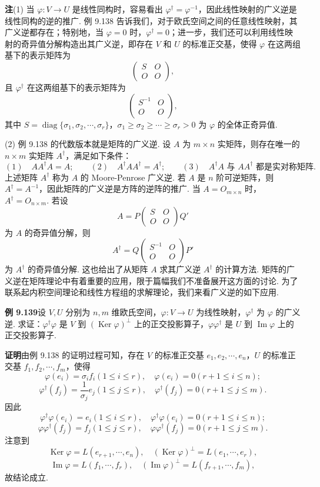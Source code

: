 \documentclass[UTF8, 12pt, fontset=fandol, oneside]{ctexart}
\begin{document}
\noindent\textbf{注}\quad (1) 当 $\varphi:V\to U$ 是线性同构时，容易看出 $\varphi^\dagger=\varphi^{-1}$，因此线性映射的广义逆是线性同构的逆的推广. 例 9.138 告诉我们，对于欧氏空间之间的任意线性映射，其广义逆都存在；特别地，当 $\varphi=0$ 时，$\varphi^\dagger=0$；进一步，我们还可以利用线性映射的奇异值分解构造出其广义逆，即存在 $V$ 和 $U$ 的标准正交基，使得 $\varphi$ 在这两组基下的表示矩阵为
\[
\begin{pmatrix}
S&O\\
O&O
\end{pmatrix},
\]
且 $\varphi^\dagger$ 在这两组基下的表示矩阵为
\[
\begin{pmatrix}
S^{-1}&O\\
O&O
\end{pmatrix},
\]
其中 $S=\operatorname{diag}\{\sigma_1,\sigma_2,\cdots,\sigma_r\}$，$\sigma_1\ge\sigma_2\ge\cdots\ge\sigma_r>0$ 为 $\varphi$ 的全体正奇异值.

(2) 例 9.138 的代数版本就是矩阵的广义逆. 设 $A$ 为 $m\times n$ 实矩阵，则存在唯一的 $n\times m$ 实矩阵 $A^\dagger$，满足如下条件：
\[
(1)\quad AA^\dagger A=A;\qquad
(2)\quad A^\dagger AA^\dagger=A^\dagger;\qquad
(3)\quad A^\dagger A\text{ 与 }AA^\dagger\text{ 都是实对称矩阵.}
\]
上述矩阵 $A^\dagger$ 称为 $A$ 的 Moore-Penrose 广义逆. 若 $A$ 是 $n$ 阶可逆矩阵，则 $A^\dagger=A^{-1}$，因此矩阵的广义逆是方阵的逆阵的推广. 当 $A=O_{m\times n}$ 时，$A^\dagger=O_{n\times m}$. 若设
\[
A=P\begin{pmatrix}
S&O\\
O&O
\end{pmatrix}Q'
\]
为 $A$ 的奇异值分解，则
\[
A^\dagger=Q\begin{pmatrix}
S^{-1}&O\\
O&O
\end{pmatrix}P'
\]
为 $A^\dagger$ 的奇异值分解. 这也给出了从矩阵 $A$ 求其广义逆 $A^\dagger$ 的计算方法. 矩阵的广义逆在矩阵理论中有着重要的应用，限于篇幅我们不准备展开这方面的讨论. 为了联系起内积空间理论和线性方程组的求解理论，我们来看广义逆的如下应用.

\noindent\textbf{例 9.139}\quad 设 $V,U$ 分别为 $n,m$ 维欧氏空间，$\varphi:V\to U$ 为线性映射，$\varphi^\dagger$ 为 $\varphi$ 的广义逆. 求证：$\varphi^\dagger\varphi$ 是 $V$ 到 $(\operatorname{Ker}\varphi)^\perp$ 上的正交投影算子，$\varphi\varphi^\dagger$ 是 $U$ 到 $\operatorname{Im}\varphi$ 上的正交投影算子.

\noindent\textbf{证明}\quad 由例 9.138 的证明过程可知，存在 $V$ 的标准正交基 $e_1,e_2,\cdots,e_n$，$U$ 的标准正交基 $f_1,f_2,\cdots,f_m$，使得
\[
\varphi(e_i)=\sigma_if_i(1\le i\le r),\quad \varphi(e_i)=0(r+1\le i\le n);
\]
\[
\varphi^\dagger(f_j)=\frac{1}{\sigma_j}e_j(1\le j\le r),\quad \varphi^\dagger(f_j)=0(r+1\le j\le m).
\]
因此
\[
\varphi^\dagger\varphi(e_i)=e_i(1\le i\le r),\quad \varphi^\dagger\varphi(e_i)=0(r+1\le i\le n);
\]
\[
\varphi\varphi^\dagger(f_j)=f_j(1\le j\le r),\quad \varphi\varphi^\dagger(f_j)=0(r+1\le j\le m).
\]
注意到
\[
\operatorname{Ker}\varphi=L(e_{r+1},\cdots,e_n),\quad
(\operatorname{Ker}\varphi)^\perp=L(e_1,\cdots,e_r),
\]
\[
\operatorname{Im}\varphi=L(f_1,\cdots,f_r),\quad
(\operatorname{Im}\varphi)^\perp=L(f_{r+1},\cdots,f_m),
\]
故结论成立.
\end{document}
